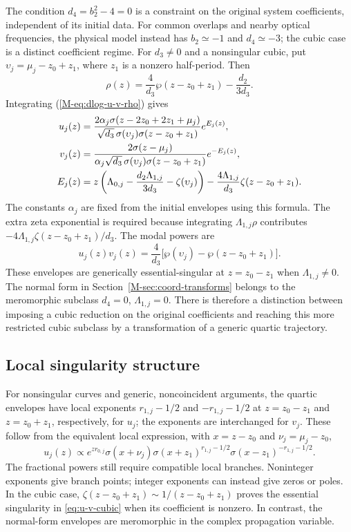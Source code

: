 \documentclass[11pt,a4paper]{article}
\newcommand{\externaleqref}[1]{\textup{(\ref*{#1})}}
\begin{document}
The condition $d_4=b_2^2-4=0$ is a constraint on the original system coefficients, independent of its initial data.
For common overlaps and nearby optical frequencies, the physical model instead has $b_2\simeq-1$ and $d_4\simeq-3$; the cubic case is a distinct coefficient regime.
For $d_3\ne0$ and a nonsingular cubic, put $\upsilon_j=\mu_j-z_0+z_1$, where $z_1$ is a nonzero half-period.
Then
\begin{equation}
\rho(z)=\frac{4}{d_3}\wp(z-z_0+z_1)-\frac{d_2}{3d_3}.
\end{equation}
Integrating \externaleqref{M-eq:dlog-u-v-rho} gives
\begin{align}
u_j(z)&=\frac{2\alpha_j\sigma(z-2z_0+2z_1+\mu_j)}{\sqrt{d_3}\,\sigma(\upsilon_j)\sigma(z-z_0+z_1)}e^{E_j(z)},\notag\\
v_j(z)&=\frac{2\sigma(z-\mu_j)}{\alpha_j\sqrt{d_3}\,\sigma(\upsilon_j)\sigma(z-z_0+z_1)}e^{-E_j(z)},\notag\\
E_j(z)&=z\left(\Lambda_{0,j}-\frac{d_2\Lambda_{1,j}}{3d_3}-\zeta(\upsilon_j)\right)
-\frac{4\Lambda_{1,j}}{d_3}\zeta(z-z_0+z_1).
\label{eq:u-v-cubic}
\end{align}
The constants $\alpha_j$ are fixed from the initial envelopes using this formula.
The extra zeta exponential is required because integrating $\Lambda_{1,j}\rho$ contributes $-4\Lambda_{1,j}\zeta(z-z_0+z_1)/d_3$.
The modal powers are
\begin{equation}
u_j(z)v_j(z)=\frac{4}{d_3}\bigl[\wp(\upsilon_j)-\wp(z-z_0+z_1)\bigr].
\label{eq:modal-power-cubic}
\end{equation}
These envelopes are generically essential-singular at $z=z_0-z_1$ when $\Lambda_{1,j}\ne0$.
The normal form in Section~\ref*{M-sec:coord-transforms} belongs to the meromorphic subclass $d_4=0$, $\Lambda_{1,j}=0$.
There is therefore a distinction between imposing a cubic reduction on the original coefficients and reaching this more restricted cubic subclass by a transformation of a generic quartic trajectory.

\subsection*{Local singularity structure}
For nonsingular curves and generic, noncoincident arguments, the quartic envelopes have local exponents $r_{1,j}-1/2$ and $-r_{1,j}-1/2$ at $z=z_0-z_1$ and $z=z_0+z_1$, respectively, for $u_j$; the exponents are interchanged for $v_j$.
These follow from the equivalent local expression, with $x=z-z_0$ and $\nu_j=\mu_j-z_0$,
\begin{equation}
u_j(z)\propto e^{zr_{0,j}}\sigma(x+\nu_j)
\sigma(x+z_1)^{r_{1,j}-1/2}\sigma(x-z_1)^{-r_{1,j}-1/2}.
\end{equation}
The fractional powers still require compatible local branches.
Noninteger exponents give branch points; integer exponents can instead give zeros or poles.
In the cubic case, $\zeta(z-z_0+z_1)\sim1/(z-z_0+z_1)$ proves the essential singularity in \eqref{eq:u-v-cubic} when its coefficient is nonzero.
In contrast, the normal-form envelopes are meromorphic in the complex propagation variable.
\end{document}
